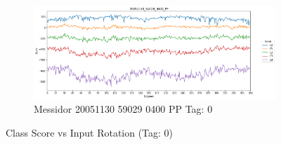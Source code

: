 \begin{figure}[ht!]
\begin{subfigure}[b]{ 0.85\textwidth}
		\centering
		\includegraphics[width=\textwidth]{Figures/chapter_stability/20051130_59029_0400_PP/r/scores.png}
		\caption{Messidor 20051130 59029 0400 PP Tag: 0}		
	\end{subfigure}
	\hfill 
	\caption[Score vs Rotation (Tag: 0)]{Class Score vs Input Rotation (Tag: 0)}  
	\label{sta:fig:rot0} 
\end{figure}

